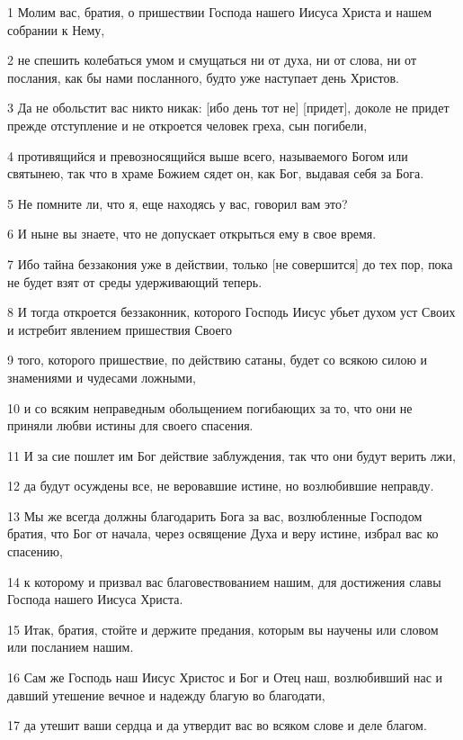 \par 1 Молим вас, братия, о пришествии Господа нашего Иисуса Христа и нашем собрании к Нему,
\par 2 не спешить колебаться умом и смущаться ни от духа, ни от слова, ни от послания, как бы нами посланного, будто уже наступает день Христов.
\par 3 Да не обольстит вас никто никак: [ибо день тот не] [придет], доколе не придет прежде отступление и не откроется человек греха, сын погибели,
\par 4 противящийся и превозносящийся выше всего, называемого Богом или святынею, так что в храме Божием сядет он, как Бог, выдавая себя за Бога.
\par 5 Не помните ли, что я, еще находясь у вас, говорил вам это?
\par 6 И ныне вы знаете, что не допускает открыться ему в свое время.
\par 7 Ибо тайна беззакония уже в действии, только [не совершится] до тех пор, пока не будет взят от среды удерживающий теперь.
\par 8 И тогда откроется беззаконник, которого Господь Иисус убьет духом уст Своих и истребит явлением пришествия Своего
\par 9 того, которого пришествие, по действию сатаны, будет со всякою силою и знамениями и чудесами ложными,
\par 10 и со всяким неправедным обольщением погибающих за то, что они не приняли любви истины для своего спасения.
\par 11 И за сие пошлет им Бог действие заблуждения, так что они будут верить лжи,
\par 12 да будут осуждены все, не веровавшие истине, но возлюбившие неправду.
\par 13 Мы же всегда должны благодарить Бога за вас, возлюбленные Господом братия, что Бог от начала, через освящение Духа и веру истине, избрал вас ко спасению,
\par 14 к которому и призвал вас благовествованием нашим, для достижения славы Господа нашего Иисуса Христа.
\par 15 Итак, братия, стойте и держите предания, которым вы научены или словом или посланием нашим.
\par 16 Сам же Господь наш Иисус Христос и Бог и Отец наш, возлюбивший нас и давший утешение вечное и надежду благую во благодати,
\par 17 да утешит ваши сердца и да утвердит вас во всяком слове и деле благом.

